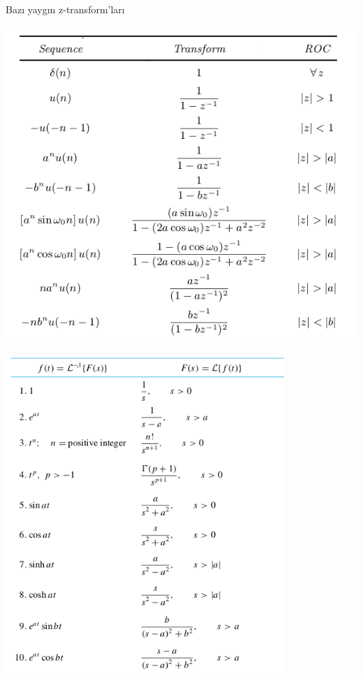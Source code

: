 \documentclass[12pt,fleqn]{article}\usepackage{../../common}
\begin{document}
\newpage

Bazı yaygın z-transform'ları 

\includegraphics[height=12cm]{z_01.png}

\includegraphics[height=12cm]{lap_1.png}
\end{document}
